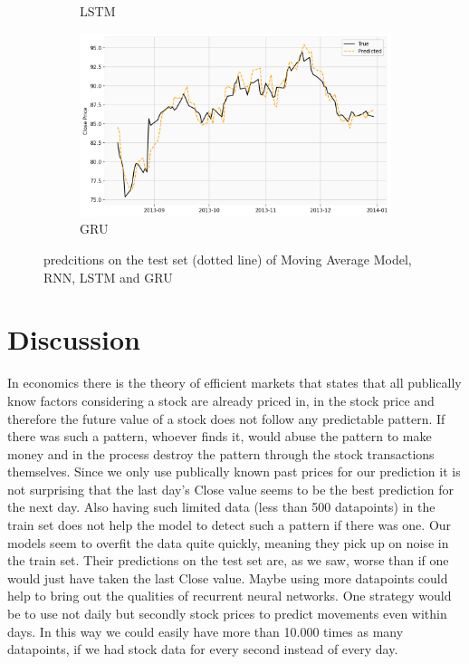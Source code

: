 \documentclass[utf8x]{ctexart}
\begin{document}
\begin{figure}[htb]
\begin{subfigure}[b]{0.48\textwidth}
    \caption{LSTM}
    \label{fig:lstm_prediction}
  \end{subfigure}
  \begin{subfigure}[b]{0.48\textwidth}
    \centering
    \includegraphics[width=\textwidth]{../images/gru_prediction.png}
    \caption{GRU}
    \label{fig:gru_prediction}
  \end{subfigure}
  \caption{predcitions on the test set (dotted line) of Moving Average Model, RNN, LSTM and GRU}
  \label{fig:predictions}
\end{figure}

\section{Discussion}

In economics there is the theory of efficient markets that states that all publically know factors considering a stock are already priced in, in the stock price and therefore the future value of a stock does not follow any predictable pattern. If there was such a pattern, whoever finds it, would abuse the pattern to make money and in the process destroy the pattern through the stock transactions themselves. Since we only use publically known past prices for our prediction it is not surprising that the last day's Close value seems to be the best prediction for the next day.
Also having such limited data (less than 500 datapoints) in the train set does not help the model to detect such a pattern if there was one. Our models seem to overfit the data quite quickly, meaning they pick up on noise in the train set. Their predictions on the test set are, as we saw, worse than if one would just have taken the last Close value.
Maybe using more datapoints could help to bring out the qualities of recurrent neural networks. One strategy would be to use not daily but secondly stock prices to predict movements even within days. In this way we could easily have more than 10.000 times as many datapoints, if we had stock data for every second instead of every day.
\end{document}
